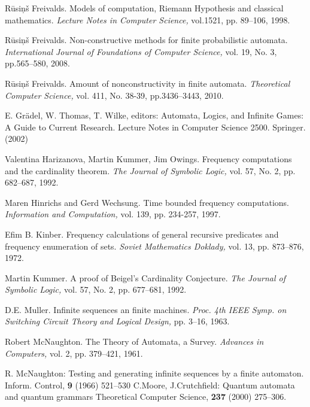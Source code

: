 \documentclass{llncs}
\begin{document}
\begin{thebibliography}{99}
R\= usi\c n\v s Freivalds.
Models of computation, Riemann Hypothesis and classical mathematics.
{\em Lecture Notes in Computer Science,} vol.1521, pp. 89--106, 1998.

R\= usi\c n\v s Freivalds.
Non-constructive methods for finite probabilistic automata.
{\em International Journal of Foundations of Computer Science,} vol. 19, No. 3, pp.565--580, 2008.

R\= usi\c n\v s Freivalds.
Amount of nonconstructivity in finite automata. 
{\em Theoretical Computer Science,} vol. 411, No. 38-39, pp.3436--3443, 2010.

\fi

E. Gr\"adel, W. Thomas, T. Wilke, editors: 
Automata, Logics, and Infinite Games: A Guide to Current Research.
Lecture Notes in Computer Science 2500. Springer. (2002)
%


Valentina Harizanova, Martin Kummer, Jim Owings.
Frequency computations and the cardinality theorem.
{\em The Journal of Symbolic Logic,} vol. 57, No. 2, pp. 682--687, 1992.

Maren Hinrichs and Gerd Wechsung.
Time bounded frequency computations.
{\em Information and Computation,} vol. 139, pp. 234-257, 1997.



Efim B. Kinber.
Frequency calculations of general recursive predicates and frequency
enumeration of sets.
{\em Soviet Mathematics Doklady,} vol. 13, pp. 873--876, 1972.

\iffalse
\bibitem{Ko97}
A. Kondacs, J. Watrous:
On the power of quantum finite state automata. 
Proc. FOCS'97, (1997) 66--75.
%
\fi

Martin Kummer.
A proof of Beigel's Cardinality Conjecture. 
{\em The Journal of Symbolic Logic,} vol. 57, No. 2, pp. 677--681, 1992.

D.E. Muller. 
Infinite sequences an finite machines.
{\em Proc. 4th IEEE Symp. on Switching Circuit Theory and Logical Design,} pp. 3--16, 1963.

Robert McNaughton.
The Theory of Automata, a Survey.
{\em Advances in Computers,} vol. 2, pp. 379--421, 1961.

R. McNaughton: 
Testing and generating infinite sequences by a finite automaton.
Inform. Control, {\bf 9} (1966) 521--530
%
C.Moore, J.Crutchfield:
Quantum automata and quantum grammars
Theoretical Computer Science, {\bf 237} (2000) 275--306.
%


\end{thebibliography}
\end{document}
